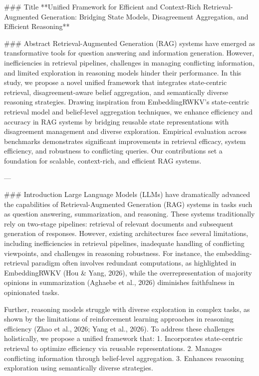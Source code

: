 ### Title  
**Unified Framework for Efficient and Context-Rich Retrieval-Augmented Generation: Bridging State Models, Disagreement Aggregation, and Efficient Reasoning**  

### Abstract  
Retrieval-Augmented Generation (RAG) systems have emerged as transformative tools for question answering and information generation. However, inefficiencies in retrieval pipelines, challenges in managing conflicting information, and limited exploration in reasoning models hinder their performance. In this study, we propose a novel unified framework that integrates state-centric retrieval, disagreement-aware belief aggregation, and semantically diverse reasoning strategies. Drawing inspiration from EmbeddingRWKV's state-centric retrieval model and belief-level aggregation techniques, we enhance efficiency and accuracy in RAG systems by bridging reusable state representations with disagreement management and diverse exploration. Empirical evaluation across benchmarks demonstrates significant improvements in retrieval efficacy, system efficiency, and robustness to conflicting queries. Our contributions set a foundation for scalable, context-rich, and efficient RAG systems.  

---

### Introduction  
Large Language Models (LLMs) have dramatically advanced the capabilities of Retrieval-Augmented Generation (RAG) systems in tasks such as question answering, summarization, and reasoning. These systems traditionally rely on two-stage pipelines: retrieval of relevant documents and subsequent generation of responses. However, existing architectures face several limitations, including inefficiencies in retrieval pipelines, inadequate handling of conflicting viewpoints, and challenges in reasoning robustness. For instance, the embedding-retrieval paradigm often involves redundant computations, as highlighted in EmbeddingRWKV (Hou & Yang, 2026), while the overrepresentation of majority opinions in summarization (Aghaebe et al., 2026) diminishes faithfulness in opinionated tasks.  

Further, reasoning models struggle with diverse exploration in complex tasks, as shown by the limitations of reinforcement learning approaches in reasoning efficiency (Zhao et al., 2026; Yang et al., 2026). To address these challenges holistically, we propose a unified framework that:  
1. Incorporates state-centric retrieval to optimize efficiency via reusable representations.  
2. Manages conflicting information through belief-level aggregation.  
3. Enhances reasoning exploration using semantically diverse strategies.  

